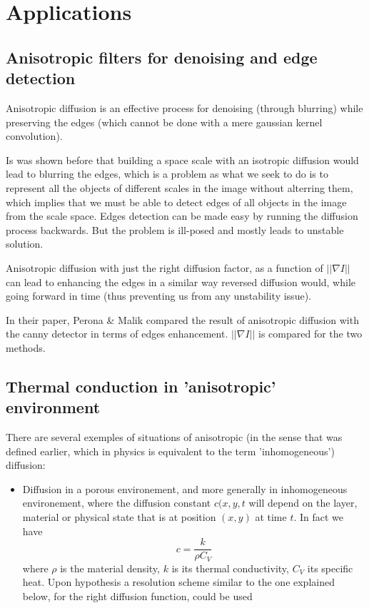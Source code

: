 \documentclass[12pt,a4paper]{article}
\begin{document}
\section{Applications}

\subsection{Anisotropic filters for denoising and edge detection}

Anisotropic diffusion is an effective process for denoising (through blurring) while preserving the edges (which cannot be done with a mere gaussian kernel convolution). 

Is was shown before that building a space scale with an isotropic diffusion would lead to blurring the edges, which is a problem as what we seek to do is to represent all the objects of different scales in the image without alterring them, which implies that we must be able to detect edges of all objects in the image from the scale space.
Edges detection can be made easy by running the diffusion process backwards. But the problem is ill-posed and mostly leads to unstable solution.

Anisotropic diffusion with just the right diffusion factor, as a function of $|| \nabla I||$ can lead to enhancing the edges in a similar way reversed diffusion would, while going forward in time (thus preventing us from any unstability issue).

In their paper, Perona \& Malik compared the result of anisotropic diffusion with the canny detector in terms of edges enhancement. $|| \nabla I ||$ is compared for the two methods.

\subsection{Thermal conduction in 'anisotropic' environment}

There are several exemples of situations of anisotropic (in the sense that was defined earlier, which in physics is equivalent to the term 'inhomogeneous') diffusion:
\begin{itemize}
	\item Diffusion in a porous environement, and more generally in inhomogeneous environement, where the diffusion constant $c(x,y,t$ will depend on the layer, material or physical state that is at position $(x,y)$ at time $t$. In fact we have
	\begin{equation}
	c = \frac{k}{\rho C_{V}}
	\end{equation}
	where $\rho$ is the material density, $k$ is its thermal conductivity, $C_{V}$ its specific heat.
	Upon hypothesis a resolution scheme similar to the one explained below, for the right diffusion function, could be used
\end{itemize}
\end{document}
